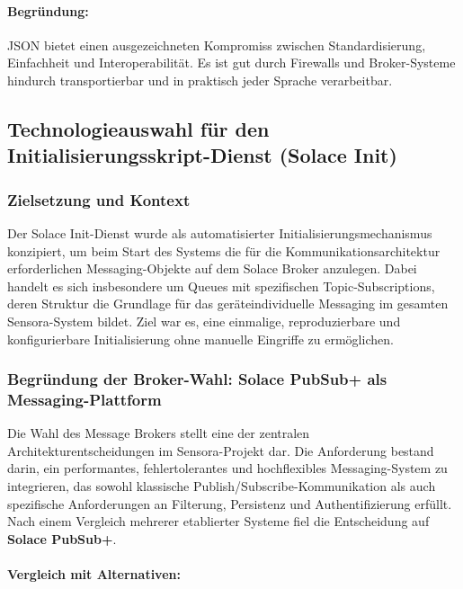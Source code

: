 \paragraph*{Begr\"undung:}

JSON bietet einen ausgezeichneten Kompromiss zwischen Standardisierung, Einfachheit und Interoperabilit\"at. Es ist gut durch Firewalls und Broker-Systeme hindurch transportierbar und in praktisch jeder Sprache verarbeitbar.

\subsection{Technologieauswahl f\"ur den Initialisierungsskript-Dienst (Solace Init)}

\subsubsection*{Zielsetzung und Kontext}

Der Solace Init-Dienst wurde als automatisierter Initialisierungsmechanismus konzipiert, um beim Start des Systems die f\"ur die Kommunikationsarchitektur erforderlichen Messaging-Objekte auf dem Solace Broker anzulegen. Dabei handelt es sich insbesondere um Queues mit spezifischen Topic-Subscriptions, deren Struktur die Grundlage f\"ur das ger\"ateindividuelle Messaging im gesamten Sensora-System bildet. Ziel war es, eine einmalige, reproduzierbare und konfigurierbare Initialisierung ohne manuelle Eingriffe zu erm\"oglichen.

\subsubsection*{Begr\"undung der Broker-Wahl: Solace PubSub+ als Messaging-Plattform}

Die Wahl des Message Brokers stellt eine der zentralen Architekturentscheidungen im Sensora-Projekt dar. Die Anforderung bestand darin, ein performantes, fehlertolerantes und hochflexibles Messaging-System zu integrieren, das sowohl klassische Publish/Subscribe-Kommunikation als auch spezifische Anforderungen an Filterung, Persistenz und Authentifizierung erf\"ullt. Nach einem Vergleich mehrerer etablierter Systeme fiel die Entscheidung auf \textbf{Solace PubSub+}.\cite{solace_overview}

\paragraph*{Vergleich mit Alternativen:}

